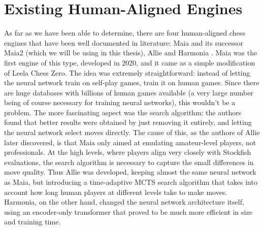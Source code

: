 \section{Existing Human-Aligned Engines}
\label{section:existing_engines}
As far as we have been able to determine, there are four human-aligned chess engines that have been well documented in literature: Maia \cite{maia} and its successor Maia2 \cite{maia2} (which we will be using in this thesis), Allie \cite{allie} and Harmonia \cite{harmonia}.
Maia was the first engine of this type, developed in 2020, and it came as a simple modification of Leela Chess Zero.
The idea was extremely straightforward: instead of letting the neural network train on self-play games, train it on human games.
Since there are huge databases with billions of human games available (a very large number being of course necessary for training neural networks), this wouldn't be a problem.
The more fascinating aspect was the search algorithm: the authors found that better results were obtained by just removing it entirely, and letting the neural network select moves directly.
The cause of this, as the authors of Allie later discovered, is that Maia only aimed at emulating amateur-level players, not professionals.
At the high levels, where players align very closely with Stockfish evaluations, the search algorithm is necessary to capture the small differences in move quality.
Thus Allie was developed, keeping almost the same neural network as Maia, but introducing a time-adaptive MCTS search algorithm that takes into account how long human players at different levels take to make moves. 
Harmonia, on the other hand, changed the neural network architecture itself, using an encoder-only transformer that proved to be much more efficient in size and training time.

